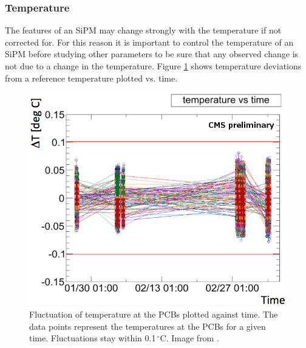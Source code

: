 \subsubsection{Temperature}
The features of an SiPM may change strongly with the temperature if not corrected for. For this reason it is important to control the temperature of an SiPM before studying other parameters to be sure that any observed change is not due to a change in the temperature. Figure \ref{kuenskentemperatureStability} shows temperature deviations from a reference temperature plotted vs. time.
\begin{figure}[h]
\centering
\begin{minipage}[t]{0.475\textwidth}
\includegraphics[width=\textwidth]{Figures/kuensken/temperature.png}
\caption{Fluctuation of temperature at the PCBs plotted against time. The data points represent the temperatures at the PCBs for a given time. Fluctuations stay within 0.1\,$^\circ$C. Image from \cite{kuenskenCalor}.}
\label{kuenskentemperatureStability}
\end{minipage}
\hspace{0.5cm}
\begin{minipage}[t]{0.455\textwidth}

\end{minipage}
\end{figure}
